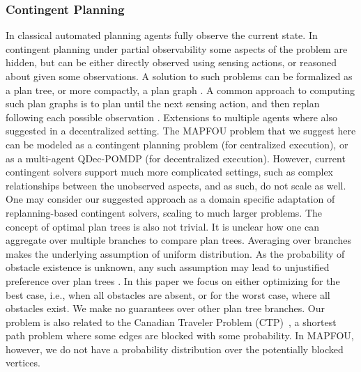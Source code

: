 \documentclass[letterpaper]{article} %
\begin{document}
\subsubsection{Contingent Planning}
In classical automated planning agents fully observe the current state. In contingent planning under partial observability \cite{albore2009translation,BrafmanS12,bonet2011planning} some aspects of the problem are hidden, but can be either directly observed using sensing actions, or reasoned about given some observations.
A solution to such problems can be formalized as a plan tree, or more compactly, a plan graph \cite{muise2014computing,MaliahKS21}.
A common approach to computing such plan graphs is to plan until the next sensing action, and then replan following each possible observation \cite{bonet2011planning,MaliahKS21}. Extensions to multiple agents where also suggested \cite{brafman2013qualitative,bazinin2018iterative} in a decentralized setting.
The MAPFOU problem that we suggest here can be modeled as a contingent planning problem (for centralized execution), or as a multi-agent QDec-POMDP (for decentralized execution). However, current contingent solvers support much more complicated settings, such as complex relationships between the unobserved aspects, and as such, do not scale as well. One may consider our suggested approach as a domain specific adaptation of replanning-based contingent solvers, scaling to much larger problems.
The concept of optimal plan trees is also not trivial. It is unclear how one can aggregate over multiple branches to compare plan trees. Averaging over branches makes the underlying assumption of uniform distribution. As the probability of obstacle existence is unknown, any such assumption may lead to unjustified preference over plan trees \cite{shmaryahu2019comparative}. In this paper we focus on either optimizing for the best case, i.e., when all obstacles are absent, or for the worst case, where all obstacles exist. We make no guarantees over other plan tree branches.
Our problem is also related to the Canadian Traveler Problem (CTP)~\cite{papadimitriou1991shortest,bnaya2009canadian}, a shortest path problem where some edges are blocked with some probability. In MAPFOU, however, we do not have a probability distribution over the potentially blocked vertices.
\end{document}
